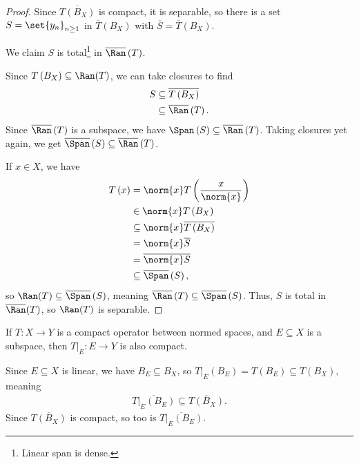 \documentclass[10pt]{mypackage}
\begin{document}
\begin{proof}
  Since $\overline{T\left(B_X\right)}$ is compact, it is separable, so there is a set $S = \set{y_{n}}_{n\geq 1}$ in $\overline{T}\left(B_{X}\right)$ with $\overline{S} = \overline{T}\left(B_{X}\right)$.\newline

  We claim $S$ is total\footnote{Linear span is dense.} in $\overline{\Ran}\left(T\right)$.\newline

  Since $T\left(B_{X}\right)\subseteq \Ran(T)$, we can take closures to find
  \begin{align*}
    S &\subseteq \overline{T\left(B_{X}\right)}\\
      &\subseteq \overline{\Ran}\left(T\right).
  \end{align*}
  Since $\overline{\Ran}\left(T\right)$ is a subspace, we have $\Span\left(S\right)\subseteq \overline{\Ran}\left(T\right)$. Taking closures yet again, we get $\overline{\Span}\left(S\right)\subseteq \overline{\Ran}\left(T\right)$.\newline

  If $x\in X$, we have
  \begin{align*}
    T\left(x\right) &= \norm{x}T\left(\frac{x}{\norm{x}}\right)\\
                    &\in \norm{x}T\left(B_{X}\right)\\
                    &\subseteq \norm{x}\overline{T\left(B_{X}\right)}\\
                    &= \norm{x}\overline{S}\\
                    &= \overline{\norm{x}S}\\
                    &\subseteq \overline{\Span}\left(S\right),
  \end{align*}
  so $\Ran(T)\subseteq \overline{\Span}\left(S\right)$, meaning $\overline{\Ran}\left(T\right)\subseteq \overline{\Span}\left(S\right)$. Thus, $S$ is total in $\overline{\Ran}(T)$, so $\Ran(T)$ is separable.
\end{proof}
\begin{exercise}
  If $T:X\rightarrow Y$ is a compact operator between normed spaces, and $E\subseteq X$ is a subspace, then $T|_{E}:E\rightarrow Y$ is also compact.
\end{exercise}
\begin{solution}
  Since $E\subseteq X$ is linear, we have $B_{E}\subseteq B_{X}$, so $T|_{E}\left(B_{E}\right) = T\left(B_{E}\right) \subseteq T\left(B_{X}\right)$, meaning
  \begin{align*}
    \overline{T|_{E}\left(B_{E}\right)} \subseteq \overline{T\left(B_{X}\right)}.
  \end{align*}
  Since $\overline{T\left(B_{X}\right)}$ is compact, so too is $\overline{T|_{E}\left(B_{E}\right)}$.
\end{solution}
\end{document}
